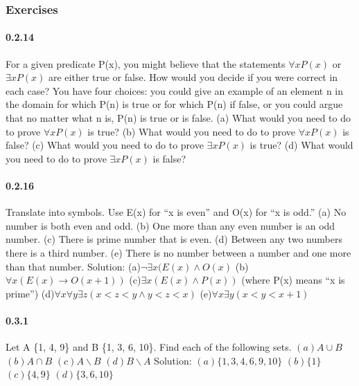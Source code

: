 \documentclass{article}
\begin{document}
\subsubsection{Exercises}
\paragraph{0.2.14}
For a given predicate P(x), you might believe that the statements $\forall xP(x)$ or $\exists xP(x)$ are either true or false. How would you decide if
you were correct in each case? You have four choices: you could give an example of an element n in the domain for which P(n) is true or for which P(n) if false, or you could argue that no matter what n is, P(n) is true or is false.\newline
(a) What would you need to do to prove $\forall x P(x)$ is true?\newline
(b) What would you need to do to prove $\forall x P(x)$ is false?\newline
(c) What would you need to do to prove $\exists x P(x)$ is true?\newline
(d) What would you need to do to prove $\exists x P(x)$ is false?\newline
\paragraph{0.2.16}
Translate into symbols. Use E(x) for “x is even” and O(x) for “x is
odd.”\newline
(a) No number is both even and odd.\newline
(b) One more than any even number is an odd number.\newline
(c) There is prime number that is even.\newline
(d) Between any two numbers there is a third number.\newline
(e) There is no number between a number and one more than that
number.\newline
Solution:\newline
(a)$\lnot\exists x(E(x)\land O(x)$\newline
(b)$\forall x(E(x)\to O(x+1))$\newline
(c)$\exists x(E(x)\land P(x))$ (where P(x) means “x is prime”)\newline
(d)$\forall x \forall y \exists z (x < z < y \land y < z < x)$\newline
(e)$\forall x \exists y (x<y<x+1)$
\paragraph{0.3.1}
Let A  \{1, 4, 9\} and B  \{1, 3, 6, 10\}. Find each of the following sets.
$ (a) A \cup B$\newline
$ (b) A \cap B$\newline
$ (c) A \backslash B$\newline
$(d) B \backslash A$\newline
Solution:\newline
$(a) \{1, 3, 4, 6, 9, 10\} $\newline
$(b) \{1\}$\newline
$(c) \{4, 9\}$\newline
$(d) \{3, 6, 10\}$\newline
\end{document}
